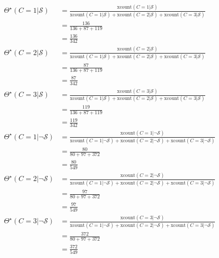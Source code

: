 \documentclass[review_Solutions]{subfiles}
\begin{document}
\begin{exercise}
\begin{boxedsolution}
\begin{align}
\Theta^\star(C=1 | \mathcal{S}) &= \frac{\mbox{xcount}(C=1| \mathcal{S})}{\mbox{xcount}(C=1| \mathcal{S}) + \mbox{xcount}(C=2| \mathcal{S})  + \mbox{xcount}(C=3 | \mathcal{S}) } \nonumber \\
&= \frac{136}{136+87+119} \nonumber \\
&= \frac{136}{342} \nonumber \\
\Theta^\star(C=2 | \mathcal{S}) &= \frac{\mbox{xcount}(C=2| \mathcal{S})}{\mbox{xcount}(C=1| \mathcal{S}) + \mbox{xcount}(C=2| \mathcal{S})  + \mbox{xcount}(C=3|  \mathcal{S}) } \nonumber \\
&= \frac{87}{136+87+119} \nonumber \\
&= \frac{87}{342} \nonumber \\
\Theta^\star(C=3 | \mathcal{S}) &= \frac{\mbox{xcount}(C=3| \mathcal{S})}{\mbox{xcount}(C=1| \mathcal{S}) + \mbox{xcount}(C=2| \mathcal{S})  + \mbox{xcount}(C=3 | \mathcal{S}) } \nonumber \\
&= \frac{119}{136+87+119} \nonumber \\
&= \frac{119}{342} \nonumber \\
\Theta^\star(C=1 | \neg \mathcal{S}) &= \frac{\mbox{xcount}(C=1| \neg\mathcal{S})}{\mbox{xcount}(C=1|\neg \mathcal{S}) + \mbox{xcount}(C=2| \neg\mathcal{S})  + \mbox{xcount}(C=3|\neg  \mathcal{S}) } \nonumber \\
&= \frac{80}{80 + 97 + 372} \nonumber \\
&= \frac{80}{549} \nonumber \\
\Theta^\star(C=2 | \neg \mathcal{S}) &= \frac{\mbox{xcount}(C=2| \neg\mathcal{S})}{\mbox{xcount}(C=1| \neg\mathcal{S}) + \mbox{xcount}(C=2| \neg\mathcal{S})  + \mbox{xcount}(C=3 |\neg \mathcal{S}) } \nonumber \\
&= \frac{97}{80 + 97 + 372} \nonumber \\
&= \frac{97}{549} \nonumber \\
\Theta^\star(C=3 | \neg \mathcal{S}) &= \frac{\mbox{xcount}(C=3| \neg\mathcal{S})}{\mbox{xcount}(C=1| \neg\mathcal{S}) + \mbox{xcount}(C=2| \neg\mathcal{S})  + \mbox{xcount}(C=3 | \neg\mathcal{S}) } \nonumber \\
&= \frac{372}{80 + 97 + 372} \nonumber \\
&= \frac{372}{549} \nonumber 
\end{align}

\end{boxedsolution}

\end{exercise}
\end{document}
